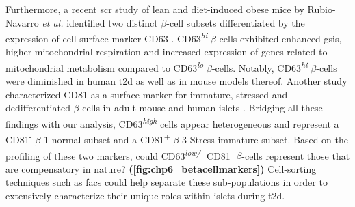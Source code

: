 \par Furthermore, a recent \gls{scr} study of lean and diet-induced obese mice by Rubio-Navarro \textit{et al.} identified two distinct $\beta$-cell subsets differentiated by the expression of cell surface marker CD63 \textbf{\cite{rubio-navarro_beta_2023}}. CD63\textsuperscript{\textit{hi}} $\beta$-cells exhibited enhanced \gls{gsis}, higher mitochondrial respiration and increased expression of genes related to mitochondrial metabolism compared to CD63\textsuperscript{\textit{lo}} $\beta$-cells. Notably, CD63\textsuperscript{\textit{hi}} $\beta$-cells were diminished in human \gls{t2d} as well as in mouse models thereof. Another study characterized CD81 as a surface marker for immature, stressed and dedifferentiated $\beta$-cells in adult mouse and human islets \textbf{\cite{salinno_cd81_2021}}. Bridging all these findings with our analysis, CD63\textsuperscript{\textit{high}} cells appear heterogeneous and represent a CD81\textsuperscript{-} $\beta$-1 normal subset and a CD81\textsuperscript{+} $\beta$-3 Stress-immature subset. Based on the profiling of these two markers, could CD63\textsuperscript{\textit{low/-}} CD81\textsuperscript{-} $\beta$-cells represent those that are compensatory in nature? \textbf{(\autoref{fig:chp6_betacellmarkers})} Cell-sorting techniques such as \gls{facs} could help separate these sub-populations in order to extensively characterize their unique roles within islets during \gls{t2d}.\\



